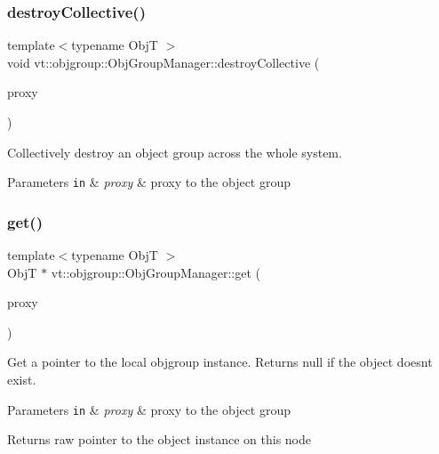 \subsubsection{\texorpdfstring{destroy\+Collective()}{destroyCollective()}}
{\footnotesize\ttfamily template$<$typename ObjT $>$ \\
void vt\+::objgroup\+::\+Obj\+Group\+Manager\+::destroy\+Collective (\begin{DoxyParamCaption}\item[{\hyperlink{structvt_1_1objgroup_1_1_obj_group_manager_aea65eef52f240a52210132eef5ce591f}{Proxy\+Type}$<$ ObjT $>$}]{proxy }\end{DoxyParamCaption})}



Collectively destroy an object group across the whole system. 


\begin{DoxyParams}[1]{Parameters}
\mbox{\tt in}  & {\em proxy} & proxy to the object group \\
\hline
\end{DoxyParams}
\mbox{\label{structvt_1_1objgroup_1_1_obj_group_manager_a4b11402fc31ca40e1dd2eacb65101e2b}} 
\subsubsection{\texorpdfstring{get()}{get()}\hspace{0.1cm}{\footnotesize\ttfamily [1/2]}}
{\footnotesize\ttfamily template$<$typename ObjT $>$ \\
ObjT $\ast$ vt\+::objgroup\+::\+Obj\+Group\+Manager\+::get (\begin{DoxyParamCaption}\item[{\hyperlink{structvt_1_1objgroup_1_1_obj_group_manager_aea65eef52f240a52210132eef5ce591f}{Proxy\+Type}$<$ ObjT $>$}]{proxy }\end{DoxyParamCaption})}



Get a pointer to the local objgroup instance. Returns null if the object doesn\textquotesingle{}t exist. 


\begin{DoxyParams}[1]{Parameters}
\mbox{\tt in}  & {\em proxy} & proxy to the object group\\
\hline
\end{DoxyParams}
\begin{DoxyReturn}{Returns}
raw pointer to the object instance on this node 
\end{DoxyReturn}
\mbox{\label{structvt_1_1objgroup_1_1_obj_group_manager_a70e5e1d0ada31d6f88a8ec88965df895}} 
